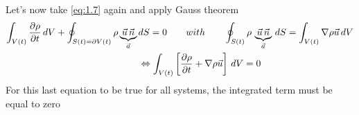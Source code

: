 	Let's now take \eqref{eq:1.7} again and apply Gauss theorem
	\begin{equation}
	\begin{aligned}
		\int _{V(t)} \frac{\D \rho}{\D t}\, dV + \oint _{S(t) = \D V(t)} \rho \underbrace{\vec{u}\, \vec{n}}_{\vec{a}}\, &dS =0 \qquad with \qquad 
		\oint _{S(t)} \rho\, \underbrace{\vec{u}\, \vec{n}}_{\vec{a}}\, dS = \int _{V(t)} \nabla \rho \vec{u} \, dV \\
		&\Leftrightarrow \int _{V(t)} \left[ \frac{\D \rho}{\D t} + \nabla \rho \vec{u} \right] \,dV = 0
		\end{aligned}
	\end{equation}
	For this last equation to be true for all systems, the integrated term must be equal to zero 
	\begin{center}
	\end{center}
	
